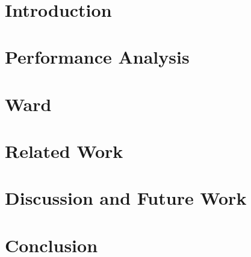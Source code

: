 \documentclass[letterpaper,12pt,oneside]{book}
\begin{document}

~\newpage


~\newpage


~\newpage

\pagestyle{plain}
\tableofcontents

\chapter{Introduction}


\chapter{Performance Analysis}
\label{ch:evolution}







\chapter{Ward}
\label{ch:ward}










\chapter{Related Work}


\chapter{Discussion and Future Work}


\chapter{Conclusion}


\pagebreak
{}

\end{document}
